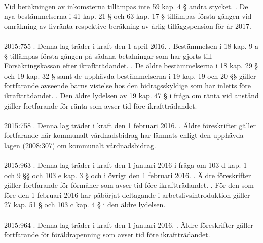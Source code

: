 \documentclass[a4paper,notitlepage,openany,10pt]{book}
\begin{document}
\paragraph*{}
Vid beräkningen av inkomsterna tillämpas inte 59 kap. 4 § andra stycket.
. De nya bestämmelserna i 41 kap. 21 § och 63 kap. 17 § tillämpas första gången vid omräkning av livränta respektive beräkning av årlig tilläggspension för år 2017.
\paragraph*{}
2015:755
. Denna lag träder i kraft den 1 april 2016.
. Bestämmelsen i 18 kap. 9 a § tillämpas första gången på sådana betalningar som har gjorts till Försäkringskassan efter ikraftträdandet.
. De äldre bestämmelserna i 18 kap. 29 § och 19 kap. 32 § samt de upphävda bestämmelserna i 19 kap. 19 och 20 §§ gäller fortfarande avseende barns vistelse hos den bidragsskyldige som har inletts före ikraftträdandet.
. Den äldre lydelsen av 19 kap. 47 § i fråga om ränta vid anstånd gäller fortfarande för ränta som avser tid före ikraftträdandet.
\paragraph*{}
2015:758
. Denna lag träder i kraft den 1 februari 2016.
. Äldre föreskrifter gäller fortfarande när kommunalt vårdnadsbidrag har lämnats enligt den upphävda lagen (2008:307) om kommunalt vårdnadsbidrag.
\paragraph*{}
2015:963
. Denna lag träder i kraft den 1 januari 2016 i fråga om 103 d kap. 1 och 9 §§ och 103 e kap. 3 § och i övrigt den 1 februari 2016.
. Äldre föreskrifter gäller fortfarande för förmåner som avser tid före ikraftträdandet.
. För den som före den 1 februari 2016 har påbörjat deltagande i arbetslivsintroduktion gäller 27 kap. 51 § och 103 c kap. 4 § i den äldre lydelsen.
\paragraph*{}
2015:964
. Denna lag träder i kraft den 1 januari 2016.
. Äldre föreskrifter gäller fortfarande för föräldrapenning som avser tid före ikraftträdandet.
\end{document}
